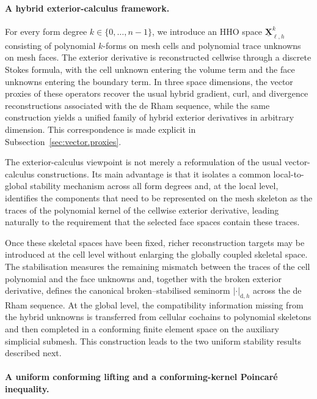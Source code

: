 \documentclass[a4paper,11pt]{article}
\theoremstyle{definition}
\newcommand{\DIFF}{\mathrm{d}}
\newcommand{\uXh}[1]{\underline{\boldsymbol{X}}_{\ell,h}^{#1}}
\begin{document}
\paragraph*{A hybrid exterior-calculus framework.}

For every form degree $k\in\{0,\ldots,n-1\}$, we introduce an HHO space $\uXh{k}$ consisting of polynomial $k$-forms on mesh cells and polynomial trace unknowns on mesh faces.
The exterior derivative is reconstructed cellwise through a discrete Stokes formula, with the cell unknown entering the volume term and the face unknowns entering the boundary term.
In three space dimensions, the vector proxies of these operators recover the usual hybrid gradient, curl, and divergence reconstructions associated with the de Rham sequence, while the same construction yields a unified family of hybrid exterior derivatives in arbitrary dimension.
This correspondence is made explicit in Subsection~\ref{sec:vector.proxies}.

The exterior-calculus viewpoint is not merely a reformulation of the usual vector-calculus constructions.
Its main advantage is that it isolates a common local-to-global stability mechanism across all form degrees and, at the local level, identifies the components that need to be represented on the mesh skeleton as the traces of the polynomial kernel of the cellwise exterior derivative, leading naturally to the requirement that the selected face spaces contain these traces.

Once these skeletal spaces have been fixed, richer reconstruction targets may be introduced at the cell level without enlarging the globally coupled skeletal space.
The stabilisation measures the remaining mismatch between the traces of the cell polynomial and the face unknowns and, together with the broken exterior derivative, defines the canonical broken--stabilised seminorm $|\cdot|_{\DIFF,h}$ across the de Rham sequence.
At the global level, the compatibility information missing from the hybrid unknowns is transferred from cellular cochains to polynomial skeletons and then completed in a conforming finite element space on the auxiliary simplicial submesh.
This construction leads to the two uniform stability results described next.

\paragraph*{A uniform conforming lifting and a conforming-kernel Poincar\'e inequality.}
\end{document}
